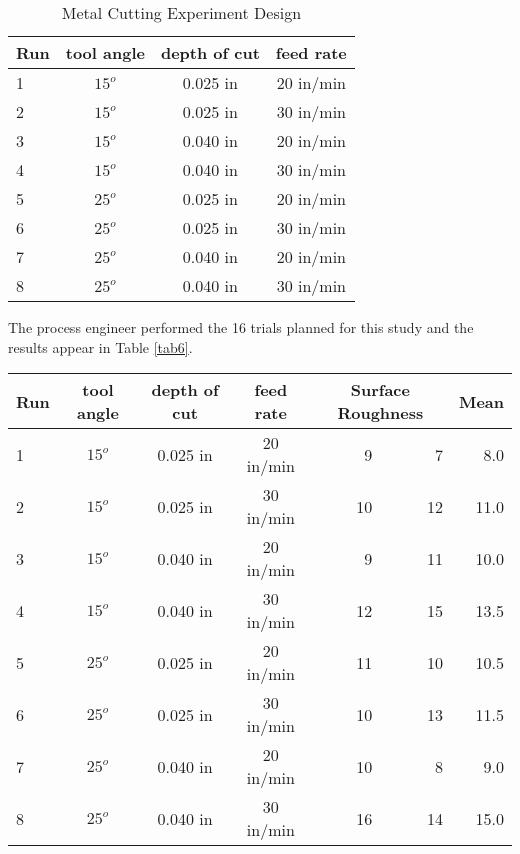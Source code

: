 \begin{table}\caption{Metal Cutting Experiment Design}\label{tab5}
\begin{center}
\begin{tabular}{|l|c|c|c|}
\hline Run & \textbf{tool angle} & \textbf{depth of cut} & \textbf{feed rate}\\ 
\hline 1 & $15^{o}$ & 0.025 in & 20 in/min \\ 
\hline 2 & $15^{o}$ & 0.025 in & 30 in/min \\ 
\hline 3 & $15^{o}$ & 0.040 in & 20 in/min \\ 
\hline 4 & $15^{o}$ & 0.040 in & 30 in/min \\
\hline 5 & $25^{o}$ & 0.025 in & 20 in/min \\
\hline 6 & $25^{o}$ & 0.025 in & 30 in/min \\
\hline 7 & $25^{o}$ & 0.040 in & 20 in/min \\
\hline 8 & $25^{o}$ & 0.040 in & 30 in/min \\ 
\hline 
\end{tabular} 
\end{center}
\end{table}

The process engineer performed the 16 trials planned for this study and the results appear in Table \ref{tab6}.
\begin{sidewaystable}[h]\caption{Metal Cutting Experiment Data Table}\label{tab6}
\begin{center}
\begin{tabular}{|l|c|c|c|r|r|r|}
\hline Run & \textbf{tool angle} & \textbf{depth of cut} & \textbf{feed rate} & \multicolumn{2}{c|}{\textbf{Surface Roughness}} & \textbf{Mean}\\ 
\hline 1 & $15^{o}$ & 0.025 in & 20 in/min &  9 &  7 &  8.0\\ 
\hline 2 & $15^{o}$ & 0.025 in & 30 in/min & 10 & 12 & 11.0\\ 
\hline 3 & $15^{o}$ & 0.040 in & 20 in/min &  9 & 11 & 10.0\\ 
\hline 4 & $15^{o}$ & 0.040 in & 30 in/min & 12 & 15 & 13.5\\
\hline 5 & $25^{o}$ & 0.025 in & 20 in/min & 11 & 10 & 10.5\\
\hline 6 & $25^{o}$ & 0.025 in & 30 in/min & 10 & 13 & 11.5\\
\hline 7 & $25^{o}$ & 0.040 in & 20 in/min & 10 &  8 &  9.0\\
\hline 8 & $25^{o}$ & 0.040 in & 30 in/min & 16 & 14 & 15.0\\ 
\hline 

\end{tabular} 
\end{center}
\end{sidewaystable}
